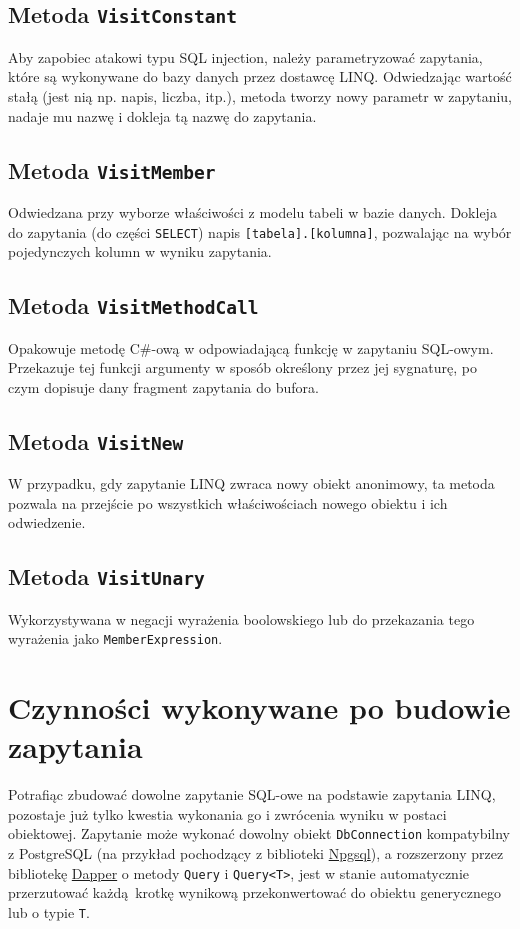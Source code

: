 \subsection{Metoda \texttt{VisitConstant}}
Aby zapobiec atakowi typu SQL injection, należy parametryzować zapytania, które są wykonywane do bazy danych przez dostawcę LINQ. Odwiedzając wartość stałą (jest nią np. napis, liczba, itp.), metoda tworzy nowy parametr w zapytaniu, nadaje mu nazwę i dokleja tą nazwę do zapytania.

\subsection{Metoda \texttt{VisitMember}}
Odwiedzana przy wyborze właściwości z modelu tabeli w bazie danych. Dokleja do zapytania (do części \texttt{SELECT}) napis \texttt{[tabela].[kolumna]}, pozwalając na wybór pojedynczych kolumn w wyniku zapytania.

\subsection{Metoda \texttt{VisitMethodCall}}
Opakowuje metodę C\#-ową w odpowiadającą funkcję w zapytaniu SQL-owym. Przekazuje tej funkcji argumenty w sposób określony przez jej sygnaturę, po czym dopisuje dany fragment zapytania do bufora.

\subsection{Metoda \texttt{VisitNew}}
W przypadku, gdy zapytanie LINQ zwraca nowy obiekt anonimowy, ta metoda pozwala na przejście po wszystkich właściwościach nowego obiektu i ich odwiedzenie.

\subsection{Metoda \texttt{VisitUnary}}
Wykorzystywana w negacji wyrażenia boolowskiego lub do przekazania tego wyrażenia jako \texttt{MemberExpression}.

\section{Czynności wykonywane po budowie zapytania}
Potrafiąc zbudować dowolne zapytanie SQL-owe na podstawie zapytania LINQ, pozostaje już tylko kwestia wykonania go i zwrócenia wyniku w postaci obiektowej. Zapytanie może wykonać dowolny obiekt \texttt{DbConnection} kompatybilny z PostgreSQL (na przykład pochodzący z biblioteki \href{http://www.npgsql.org/}{Npgsql}), a rozszerzony przez bibliotekę \href{https://github.com/StackExchange/Dapper}{Dapper} o metody \texttt{Query} i \texttt{Query<T>}, jest w stanie automatycznie przerzutować każdą krotkę wynikową przekonwertować do obiektu generycznego lub o typie \texttt{T}.

